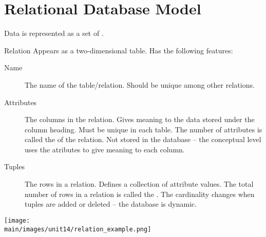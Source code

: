 \documentclass[\main/notes.tex]{subfiles}
\begin{document}
		\section{Relational Database Model}
				Data is represented as a set of .
				\begin{definition}{Relation}
					Appears as a two-dimensional table. Has the following features:
					\begin{indentparagraph}
						\begin{description}
							\item[Name] The name of the table/relation. Should be unique among other relations.
							\item[Attributes] The columns in the relation. Gives meaning to the data stored under the column heading. Must be unique in each table. The number of attributes is called the  of the relation. Not stored in the database -- the conceptual level uses the atributes to give meaning to each column.
							\item[Tuples] The rows in a relation. Defines a collection of attribute values. The total number of rows in a relation is called the . The cardinality changes when tuples are added or deleted -- the database is dynamic.
						\end{description}
					\end{indentparagraph}
					\begin{center}
						\texttt{[image: \\main/images/unit14/relation\_example.png]}
					\end{center}
				\end{definition}
\end{document}
